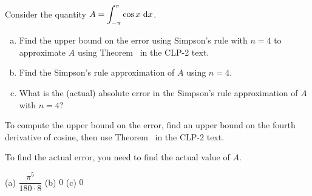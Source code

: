 \begin{Mquestion}\label{prob_s1.11:approxerror1}
Consider the quantity $A=\displaystyle\int_{-\pi}^{\pi} \cos x~\mathrm{d}x$.
\begin{enumerate}[(a)]
\item Find the upper bound on the error using Simpson's rule with $n=4$ to approximate $A$ using Theorem~ in the CLP-2 text.
\item Find the Simpson's rule approximation of $A$ using $n=4$.
\item What is the (actual) absolute error in the Simpson's rule approximation of $A$ with $n=4$?
\end{enumerate}
\end{Mquestion}
\begin{hint}
To compute the upper bound on the error, find an upper bound on the fourth derivative of cosine, then use Theorem~ in the CLP-2 text.

To find the actual error, you need to find the actual value of $A$.
\end{hint}
\begin{answer}
(a) $\dfrac{\pi^5}{180\cdot8}$
\qquad (b) $0$ \qquad (c) $0$
\end{answer}
